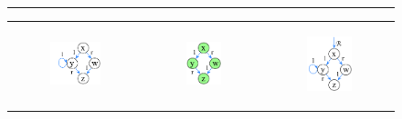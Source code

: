 \begin{figure}
\hrule
\begin{tabular}{c c c}
	\begin{subfigure}[b]{0.3\columnwidth}
      \centering	
      \includegraphics[scale=0.3]{Sections/FurtherExamples/Images/graph.pdf}
    \caption{}
    \label{subfig:graph}
    \end{subfigure}
    &
    \begin{subfigure}[b]	{0.2\columnwidth}		
      \centering	
      \includegraphics[scale=0.3]{Sections/FurtherExamples/Images/tree.pdf}
    \caption{}
    \label{subfig:tree}
    \end{subfigure}
    &
    \begin{subfigure}[b]{0.3\columnwidth}
      \centering	
      \includegraphics[scale=0.3]{Sections/FurtherExamples/Images/graphWithRootEdge.pdf}

\end{subfigure}
\end{tabular}
\end{figure}
